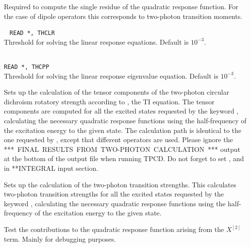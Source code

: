 \begin{description}
\item{}
Required to
compute the single residue of the quadratic
response function.
For the case of dipole operators this corresponds to two-photon
transition
moments.

\item{}\verb| |\newline
\verb|READ *, THCLR|\\
Threshold for solving the linear response equations.
Default is $10^{-3}$.

\item{}\\
\verb|READ *, THCPP|\\
Threshold for solving the linear response
eigenvalue equation. Default is $10^{-3}$.

\item{}
Sets up the calculation of the tensor components of the two-photon circular dichroism rotatory
strength according to \cite{Rizzo:TPACD}, the TI equation.
The tensor components are computed for all the excited states
requested by the keyword , calculating the necessary
quadratic response functions using the half-frequency of the
excitation energy to the given state. The calculation path is identical to the
one requested by , except that different operators are used.
Please ignore the \mbox{***~FINAL~RESULTS~FROM~TWO-PHOTON~CALCULATION~***} output
at the bottom of the output file when running TPCD.
Do not forget to set ,  and  in **INTEGRAL
input section.


\item{}
Sets up the calculation of the two-photon transition strengths. This
calculates two-photon transition strengths for all the excited states
requested by the keyword , calculating the necessary
quadratic response functions using the half-frequency of the
excitation energy to the given state.

\item{}
Test the contributions to the quadratic response function arising from
the $X^{\left[2\right]}$ term. Mainly for debugging purposes.
\end{description}


